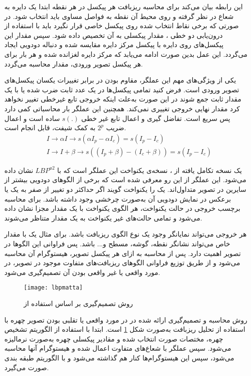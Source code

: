 این رابطه بیان می‌کند برای محاسبه ریزبافت هر پیکسل در هر نقطه ابتدا یک دایره به شعاع  در نظر گرفته و روی محیط آن  نقطه به فواصل مساوی باید انتخاب شود. در صورتی که برخی نقاط انتخاب شده روی پیکسل خاصی قرار نگیرد باید با استفاده از درون‌یابی دو خطی
، مقدار پیکسلی به آن تخصیص داده شود. سپس مقدار این پیکسل‌های روی دایره با پیکسل مرکز دایره مقایسه شده و دنباله دودویی ایجاد می‌گردد. این عمل بدین صورت ادامه می‌یابد که مرکز دایره لغزانده شده و هر بار برای هر پیکسل تصویر ورودی، مقدار  محاسبه می‌گردد.

یکی از ویژگی‌های مهم این عملگر، مقاوم بودن در برابر تغییرات یکسان پیکسل‌های تصویر ورودی است. فرض کنید تمامی پیکسل‌ها در یک عدد ثابت ضرب شده یا با یک مقدار ثابت جمع شوند در این صورت به‌علت اینکه خروجی تابع غیرخطی تغییر نخواهد کرد مقدار نهایی خروجی  تغییری نمی‌کند.
همچنین این عملگر بار محاسباتی کمی دارد پس سریع است. تفاضل گیری و اعمال تابع غیر خطی   
$s(.)$
ساده است و اعمال ضریب
$2^p$
به کمک شیفت، قابل انجام است.
\begin{align}\label{eq:lbpfeature}
	&I \to \alpha I \to s(\alpha I_p -\alpha I_c) = s(I_p - I_c) \\
	&I \to I+\beta \to s((I_p + \beta)-(I_c + \beta)) = s(I_p - I_c ) 
\end{align}

یک نسخه تکامل یافته از ، نسخه‌ی یکنواخت این عملگر است که با 
$LBP^{u2}$
 نشان داده می‌شود. این عملگر از این رو معرفی شده است که برخی از الگوهای دودویی بیشتر از سایرین در تصویر متداول‌اند. یک  را یکنواخت گویند اگر حداکثر دو تغییر از صفر به یک یا برعکس در نمایش دودویی آن به‌صورت چرخشی وجود داشته باشد. برای محاسبه برچسب خروجی در حالت یکنواخت، هر الگوی یکنواخت با یک مقدار مجزا نشان داده می‌شود و تمامی حالت‌های غیر یکنواخت به یک مقدار متناظر می‌شوند.

هر خروجی  می‌تواند نمایانگر وجود یک نوع الگوی ریزبافت باشد. برای مثال یک  با مقدار خاص می‌تواند نشانگر نقطه، گوشه، مسطح و... باشد. پس فراوانی این الگوها در تصویر اهمیت دارد. پس از محاسبه  به ازای هر پیکسل تصویر، هیستوگرام آن محاسبه می‌شود و از طریق توزیع فراوانی الگوهای ریزبافت‌های متفاوت موجود در تصویر، در مورد واقعی یا غیر واقعی بودن آن تصمیم‌گیری می‌شود.
\begin{figure}[hb]
	\centerline{\texttt{[image: lbpmatta]}}
	\caption{روش تصمیم‌گیری بر اساس استفاده از  \cite{maatta2011face}}
	\label{fig:lbpmatta}
\end{figure}

روش محاسبه و تصمیم‌گیری ارائه شده در 
\cite{maatta2011face}
در مورد واقعی یا تقلبی بودن تصویر چهره با استفاده از تحلیل ریزبافت به‌صورت شکل
\ref{fig:lbpmatta}
است.
ابتدا با استفاده از الگوریتم تشخیص چهره، مختصات صورت انتخاب شده و مقادیر پیکسلی چهره به‌صورت نرمالیزه می‌شود. سپس عملگر  با شعاع‌های متفاوت اعمال شده و هیستوگرام آنها محاسبه می‌شود، سپس این هیستوگرام‌ها کنار هم گذاشته می‌شود و با الگوریتم  طبقه بندی صورت می‌گیرد.

